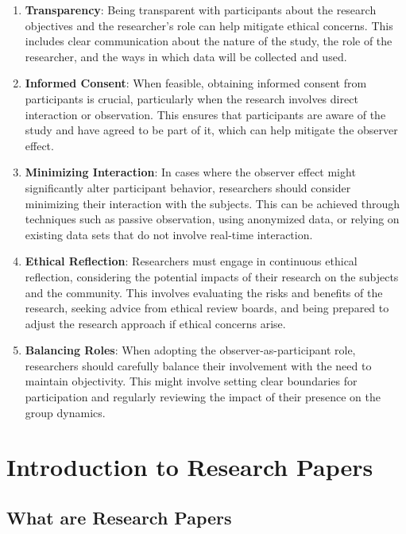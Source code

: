 \documentclass[
]{book}
\begin{document}
\begin{enumerate}
\def\labelenumi{\arabic{enumi}.}
\item
  \textbf{Transparency}: Being transparent with participants about the research objectives and the researcher's role can help mitigate ethical concerns. This includes clear communication about the nature of the study, the role of the researcher, and the ways in which data will be collected and used.
\item
  \textbf{Informed Consent}: When feasible, obtaining informed consent from participants is crucial, particularly when the research involves direct interaction or observation. This ensures that participants are aware of the study and have agreed to be part of it, which can help mitigate the observer effect.
\item
  \textbf{Minimizing Interaction}: In cases where the observer effect might significantly alter participant behavior, researchers should consider minimizing their interaction with the subjects. This can be achieved through techniques such as passive observation, using anonymized data, or relying on existing data sets that do not involve real-time interaction.
\item
  \textbf{Ethical Reflection}: Researchers must engage in continuous ethical reflection, considering the potential impacts of their research on the subjects and the community. This involves evaluating the risks and benefits of the research, seeking advice from ethical review boards, and being prepared to adjust the research approach if ethical concerns arise.
\item
  \textbf{Balancing Roles}: When adopting the observer-as-participant role, researchers should carefully balance their involvement with the need to maintain objectivity. This might involve setting clear boundaries for participation and regularly reviewing the impact of their presence on the group dynamics.
\end{enumerate}

\chapter{Introduction to Research Papers}\label{introduction-to-research-papers}

\section{What are Research Papers}\label{what-are-research-papers}
\end{document}
